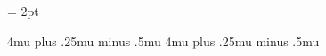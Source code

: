 %
%
%
%
%



\delimitershortfall = 2pt



              {4mu plus .25mu minus .5mu}
              {4mu plus .25mu minus .5mu}%



\outer\def \ComputerModernmathfonts {%
  \relax
  \setmathpunctuationstyle{\mit}{\rm}}

\outer{}

\outer{}

\outer\def \Stonemathfonts {%
  \setmathpunctuationstyle{\rm}{\rm}}






\def \setmathpunctuationstyle #1#2{%
  {\zmstyfam = \name{#1fam}%
   \if \eqlp{\zmstyfam}{\mitfam}%
     \definemathchar {`.} \classord  \mitfam {3A}
     \definemathchar {`,} \classpunc \mitfam {3B}
   \else
     \definemathchar {`.} \classactive \rmfam {00}
     \definemathchar {`,} \classactive \rmfam {00}
     \definemathchar {\zmperiod} \classord  \zmstyfam {2E}
     \definemathchar {\zmcomma}  \classpunc \zmstyfam {2C}
   \fi
   \zmstyfam = \name{#2fam}%
   \definemathchar {`;} \classpunc \zmstyfam {3B}
   \definemathchar {`:} \classrel  \zmstyfam {3A}}}

